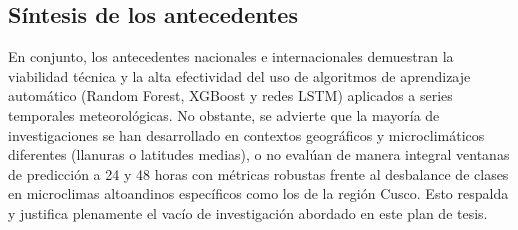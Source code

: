\subsection{Síntesis de los antecedentes}
En conjunto, los antecedentes nacionales e internacionales demuestran la viabilidad técnica y la alta efectividad del uso de algoritmos de aprendizaje automático (Random Forest, XGBoost y redes LSTM) aplicados a series temporales meteorológicas. No obstante, se advierte que la mayoría de investigaciones se han desarrollado en contextos geográficos y microclimáticos diferentes (llanuras o latitudes medias), o no evalúan de manera integral ventanas de predicción a 24 y 48 horas con métricas robustas frente al desbalance de clases en microclimas altoandinos específicos como los de la región Cusco. Esto respalda y justifica plenamente el vacío de investigación abordado en este plan de tesis.
